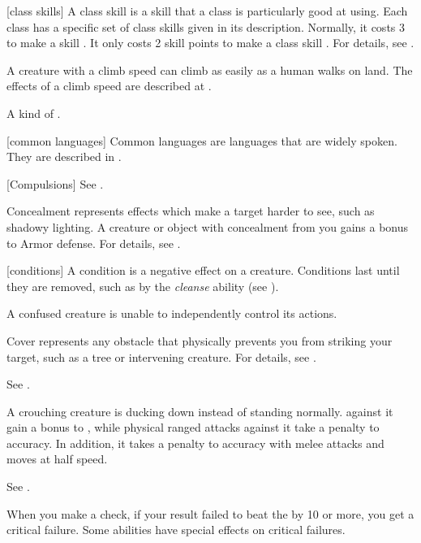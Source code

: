 [class skills] A class skill is a skill that a class is particularly good at using.
Each class has a specific set of class skills given in its description.
Normally, it costs 3  to make a skill .
It only costs 2 skill points to make a class skill .
For details, see .

 A creature with a climb speed can climb as easily as a human walks on land.
The effects of a climb speed are described at .

 A kind of .

[common languages] Common languages are languages that are widely spoken.
They are described in .

[Compulsions] See .

 Concealment represents effects which make a target harder to see, such as shadowy lighting.
A creature or object with concealment from you gains a  bonus to Armor defense.
For details, see .

[conditions] A condition is a negative effect on a creature.
Conditions last until they are removed, such as by the \textit{cleanse} ability (see ).

 A confused creature is unable to independently control its actions. \confusionexplanation

 Cover represents any obstacle that physically prevents you from striking your target, such as a tree or intervening creature.
For details, see .

 See .

 A crouching creature is ducking down instead of standing normally.
 against it gain a  bonus to , while physical ranged attacks against it take a  penalty to accuracy.
In addition, it takes a  penalty to accuracy with melee attacks and moves at half speed.

 See .

 When you make a check, if your result failed to beat the  by 10 or more, you get a critical failure.
Some abilities have special effects on critical failures.

